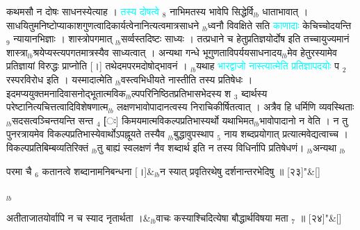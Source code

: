 \documentclass[article,12pt,a4paper]{memoir}%
\newcommand{\quotelemma}[1]{\textcolor{cyan}{#1}}
\newcounter{parCount}
\begin{document}
	  
	  \pstart \leavevmode%
	\hphantom{.}कथमसौ न दोषः साधनस्येत्याह । \quotelemma{तस्य दोषत्वे} {\tiny $_{8}$} नाभिमतस्य भावेपि सिद्धेर्वि{\tiny $_{lb}$}\leavevmode{} धाताभावात् । साधयितुमनिष्टोप्याकाशगुणत्वादिकार्यत्वेनानित्यत्वमात्रसाधने {\tiny $_{lb}$}ध्वनौ विवक्षिते सति \quotelemma{काणादाः} केचिच्चोदयन्ति {\tiny $_{9}$} \leavevmode{} न्यायानभिज्ञाः । शास्त्रोपगमात् {\tiny $_{lb}$}सर्व्वस्तदिष्टः साध्यः । तत्प्रधाने च हेतुप्रतिज्ञयोर्दोष इति तच्चायुज्यमानं शास्त्रा{\tiny $_{lb}$}श्रयेप्यस्त्यपगतमात्रस्यैव साध्यत्वात् । अन्यथा गन्धे भूगुणताविपर्ययसाधनादय{\tiny $_{lb}$}मेव हेतुरस्यामेव प्रतिज्ञायां विरुद्धः प्राप्नोति [।] तथेदमपरमदोषोद्भावनं । {\tiny $_{lb}$}यथाह \quotelemma{भारद्वाजो नास्त्यात्मेति प्रतिज्ञापदयोः} प {\tiny $_{2}$} रस्परविरोध इति । यस्मादात्मेति {\tiny $_{lb}$}वस्त्वभिधीयते नास्तीति तस्य प्रतिषेधः । इदमप्ययुक्तमनादिवासनोद्भूतात्मविक{\tiny $_{lb}$}ल्पपरिनिष्ठितप्रतिभासभेदस्य श {\tiny $_{3}$} ब्दार्थस्य परेष्टानित्यचित्तत्वादिविशेषणात्म{\tiny $_{lb}$}\leavevmode{} लक्षणभावोपादानत्वस्य निराचिकीर्षितत्वात् । अत्रैव हि धर्मिणि व्यवस्थिताः {\tiny $_{lb}$}सदसत्वञ्चिन्तयन्ति सन्त {\tiny $_{4}$} [ः] किमयमात्मविकल्पप्रतिभास्यर्थो यथाभिमत{\tiny $_{lb}$}भावोपादानो न वेति । न तु पुनरत्रायमेव विकल्पप्रतिभास्येवार्थोऽपह्नूयते तस्यैव {\tiny $_{lb}$}बुद्धावुपस्थाप {\tiny $_{5}$} नाय शब्दप्रयोगात् प्रत्यात्मवेद्यत्वाच्च । विकल्पप्रतिबिम्बव्यतिरिक्तं {\tiny $_{lb}$}तु बाह्यं स्वलक्षणं नैव शब्दार्थ इति न तस्य विधिर्नापि प्रतिषेधणं। {\tiny $_{lb}$}अन्यथा
	{}
	\pend%
      {\tiny $_{lb}$}
	  \bigskip
	  \begingroup
	
	    
	    \stanza[\smallbreak]
	  परमा चै {\tiny $_{6}$} कतानत्वे शब्दानामनिबन्धना [।]&{\tiny $_{lb}$}न स्यात् प्रवृतिरथेषु दर्शनान्तरभेदिषु ॥ [२३]{\normalfontlatin\large\qquad{}"}\&[\smallbreak]
	  
	  
	  
	  \endgroup
	{\tiny $_{lb}$}
	  \bigskip
	  \begingroup
	
	    
	    \stanza[\smallbreak]
	  अतीताजातयोर्वापि न च स्याद नृतार्थता ।&{\tiny $_{lb}$}वाचः कस्याश्चिदित्येषा बौद्धार्थविषया मता {\tiny $_{7}$} ॥ [२४]{\normalfontlatin\large\qquad{}"}\&[\smallbreak]
	  
\end{document}
